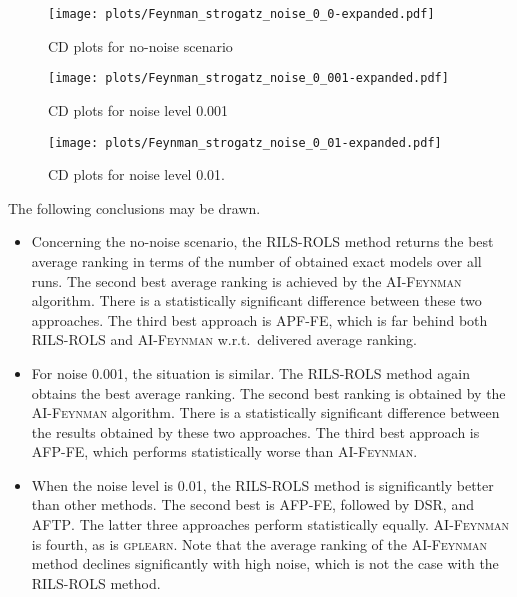 \documentclass{bmcart}
\begin{document}
\begin{figure}[!h]
	\centering
		\texttt{[image: plots/Feynman\_strogatz\_noise\_0\_0-expanded.pdf]}
		\caption{CD plots for no-noise scenario}
		\label{fig:CDplots-no-noise}
\end{figure}
	
\begin{figure}[!h]
	
	\texttt{[image: plots/Feynman\_strogatz\_noise\_0\_001-expanded.pdf]}
	\caption{CD plots for noise level 0.001}
	\label{fig:CDplots-noise0.001}
\end{figure}
	
	\begin{figure}[!h]
		\texttt{[image: plots/Feynman\_strogatz\_noise\_0\_01-expanded.pdf]}
		\caption{CD plots for noise level 0.01. }
		\label{fig:CDplots-noise0.01}
	\end{figure}

The following conclusions may be drawn.

\begin{itemize}
	\item  Concerning the no-noise scenario, the \textsc{RILS}-\textsc{ROLS} method returns the best average ranking in terms of the number of obtained exact models over all runs.  The second best average ranking is achieved by the \textsc{AI-Feynman} algorithm. There is a statistically significant difference between these two approaches. The third best approach is \textsc{APF-FE},  which is far behind both \textsc{RILS}-\textsc{ROLS} and \textsc{AI-Feynman} w.r.t.\ delivered average ranking.  
	\item  For noise 0.001, the situation is similar. The \textsc{RILS}-\textsc{ROLS} method again obtains the best average ranking. The second best ranking is obtained by the \textsc{AI-Feynman} algorithm. There is a statistically significant difference between the results obtained by these two approaches. The third best approach is \textsc{AFP-FE}, which performs statistically worse than \textsc{AI-Feynman}.  
	\item  When the noise level is 0.01, the \textsc{RILS-ROLS} method is significantly better than other methods. The second best is \textsc{AFP-FE}, followed by \textsc{DSR}, and \textsc{AFTP}. The latter three approaches perform statistically equally. \textsc{AI-Feynman} is fourth, as is \textsc{gplearn}. Note that the average ranking of the \textsc{AI-Feynman} method declines significantly with high noise, which is not the case with the \textsc{RILS}-\textsc{ROLS} method.   
	
\end{itemize}
\end{document}
